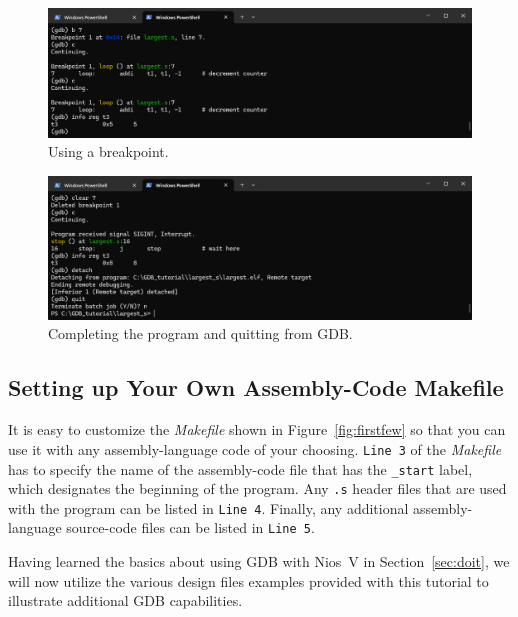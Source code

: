 \documentclass[11pt, twoside, pdftex]{article}
\begin{document}
\begin{figure}[h]
    \begin{center}
        \includegraphics[scale=.6]{figures/gdb3.png}
        \caption{Using a breakpoint.}
        \label{fig:gdb3}
    \end{center}
\end{figure}

\begin{figure}[h]
    \begin{center}
        \includegraphics[scale=.6]{figures/gdb4.png}
        \caption{Completing the program and quitting from GDB.}
        \label{fig:gdb4}
    \end{center}
\end{figure}

\subsection{Setting up Your Own Assembly-Code Makefile}
\label{sec:yourownass}

It is easy to customize the {\it Makefile} shown in Figure~\ref{fig:firstfew} so that you
can use it with any assembly-language code of your choosing.  \texttt{Line 3} of the
{\it Makefile} has to specify the name of the assembly-code file that has the \texttt{\_start}
label, which designates the beginning of the program. Any \texttt{.s} header files that are
used with the program can be listed in \texttt{Line 4}. Finally, any additional 
assembly-language source-code files can be listed in \texttt{Line 5}. 

Having learned the basics about using GDB with Nios~V in Section~\ref{sec:doit}, we will 
now utilize the various design files examples provided with this tutorial to illustrate
additional GDB capabilities. 
\end{document}
